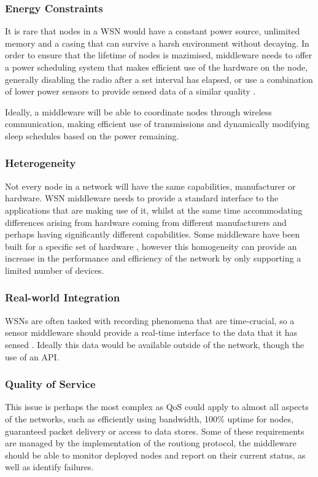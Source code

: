 	\subsubsection{Energy Constraints}
		It is rare that nodes in a WSN would have a constant power source, unlimited memory and a casing that can survive a harsh environment without decaying. In order to ensure that the lifetime of nodes is mazimised, middleware needs to offer a power scheduling system that makes efficient use of the hardware on the node, generally disabling the radio after a set interval has elapsed, or use a combination of lower power sensors to provide sensed data of a similar quality \cite{Heinzelman2004}.

		Ideally, a middleware will be able to coordinate nodes through wireless communication, making efficient use of transmissions and dynamically modifying sleep schedules based on the power remaining.
	\subsubsection{Heterogeneity}
		Not every node in a network will have the same capabilities, manufacturer or hardware. WSN middleware needs to provide a standard interface to the applications that are making use of it, whilst at the same time accommodating differences arising from hardware coming from different manufacturers and perhaps having significantly different capabilities. Some middleware have been built for a specific set of hardware \cite{Tengg2007}, however this homogeneity can provide an increase in the performance and efficiency of the network by only supporting a limited number of devices.
	\subsubsection{Real-world Integration}
		WSNs are often tasked with recording phenomena that are time-crucial, so a sensor middleware should provide a real-time interface to the data that it has sensed \cite{F2006}. Ideally this data would be available outside of the network, though the use of an API.
	\subsubsection{Quality of Service}
		This issue is perhaps the most complex as QoS could apply to almost all aspects of the networks, such as efficiently using bandwidth, 100\% uptime for nodes, guaranteed packet delivery or access to data stores. Some of these requirements are managed by the implementation of the routiong protocol, the middleware should be able to monitor deployed nodes and report on their current status, as well as identify failures.

